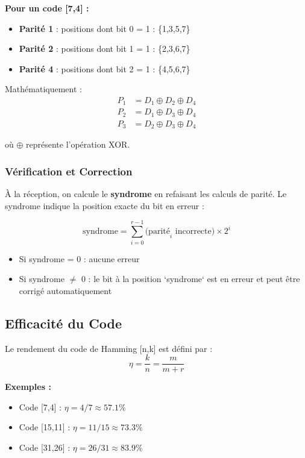 \documentclass[12pt, a4paper]{article}
\begin{document}
\textbf{Pour un code [7,4] :}
\begin{itemize}
    \item \textbf{Parité 1} : positions dont bit 0 = 1 : \{1,3,5,7\}
    \item \textbf{Parité 2} : positions dont bit 1 = 1 : \{2,3,6,7\}
    \item \textbf{Parité 4} : positions dont bit 2 = 1 : \{4,5,6,7\}
\end{itemize}

Mathématiquement :
\begin{align}
P_1 &= D_1 \oplus D_2 \oplus D_4 \\
P_2 &= D_1 \oplus D_3 \oplus D_4 \\
P_3 &= D_2 \oplus D_3 \oplus D_4
\end{align}

où $\oplus$ représente l'opération XOR.

\subsubsection{Vérification et Correction}

À la réception, on calcule le \textbf{syndrome} en refaisant les calculs de parité. Le syndrome indique la position exacte du bit en erreur :

$$\text{syndrome} = \sum_{i=0}^{r-1} \text{(parité}_i \text{ incorrecte)} \times 2^i$$

\begin{itemize}
    \item Si syndrome = 0 : aucune erreur
    \item Si syndrome $\neq$ 0 : le bit à la position `syndrome` est en erreur et peut être corrigé automatiquement
\end{itemize}

\subsection{Efficacité du Code}

Le rendement du code de Hamming [n,k] est défini par :
$$\eta = \frac{k}{n} = \frac{m}{m+r}$$

\textbf{Exemples :}
\begin{itemize}
    \item Code [7,4] : $\eta = 4/7 \approx 57.1\%$
    \item Code [15,11] : $\eta = 11/15 \approx 73.3\%$
    \item Code [31,26] : $\eta = 26/31 \approx 83.9\%$
\end{itemize}
\end{document}
